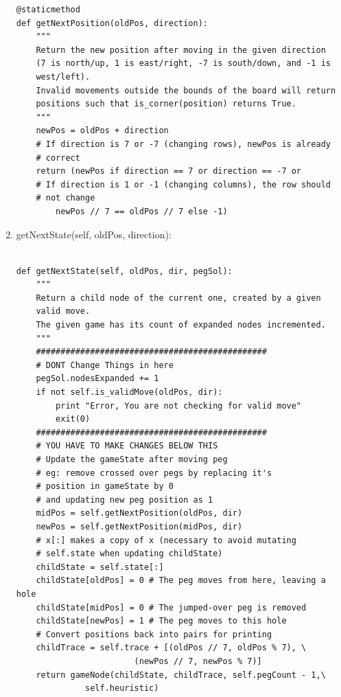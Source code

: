 \documentclass[11pt,letter]{article}
\begin{document}
\begin{enumerate}
\begin{lstlisting}[frame=single]
@staticmethod
def getNextPosition(oldPos, direction):
    """
    Return the new position after moving in the given direction
    (7 is north/up, 1 is east/right, -7 is south/down, and -1 is
    west/left).
    Invalid movements outside the bounds of the board will return
    positions such that is_corner(position) returns True.
    """
    newPos = oldPos + direction
    # If direction is 7 or -7 (changing rows), newPos is already
    # correct
    return (newPos if direction == 7 or direction == -7 or
    # If direction is 1 or -1 (changing columns), the row should
    # not change
        newPos // 7 == oldPos // 7 else -1)
\end{lstlisting}
\item getNextState(self, oldPos, direction):

\begin{lstlisting}[frame=single]  % Start your code-block

def getNextState(self, oldPos, dir, pegSol):
    """
    Return a child node of the current one, created by a given
    valid move.
    The given game has its count of expanded nodes incremented.
    """
    ###############################################
    # DONT Change Things in here
    pegSol.nodesExpanded += 1
    if not self.is_validMove(oldPos, dir):
        print "Error, You are not checking for valid move"
        exit(0)
    ###############################################
    # YOU HAVE TO MAKE CHANGES BELOW THIS
    # Update the gameState after moving peg
    # eg: remove crossed over pegs by replacing it's
    # position in gameState by 0
    # and updating new peg position as 1
    midPos = self.getNextPosition(oldPos, dir)
    newPos = self.getNextPosition(midPos, dir)
    # x[:] makes a copy of x (necessary to avoid mutating
    # self.state when updating childState)
    childState = self.state[:]
    childState[oldPos] = 0 # The peg moves from here, leaving a hole
    childState[midPos] = 0 # The jumped-over peg is removed
    childState[newPos] = 1 # The peg moves to this hole
    # Convert positions back into pairs for printing
    childTrace = self.trace + [(oldPos // 7, oldPos % 7), \
                        (newPos // 7, newPos % 7)]
    return gameNode(childState, childTrace, self.pegCount - 1,\
              self.heuristic)
\end{lstlisting}
\end{enumerate}
\end{document}
